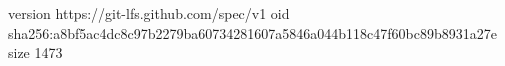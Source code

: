 version https://git-lfs.github.com/spec/v1
oid sha256:a8bf5ac4dc8c97b2279ba60734281607a5846a044b118c47f60bc89b8931a27e
size 1473
